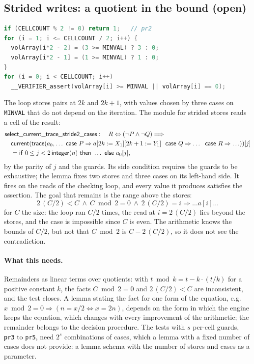 \subsection{Strided writes: a quotient in the bound (open)}\label{sec:pr2}
\begin{lstlisting}[language=C]
if (CELLCOUNT % 2 != 0) return 1;   // pr2
for (i = 1; i <= CELLCOUNT / 2; i++) {
  volArray[i*2 - 2] = (3 >= MINVAL) ? 3 : 0;
  volArray[i*2 - 1] = (1 >= MINVAL) ? 1 : 0;
}
for (i = 0; i < CELLCOUNT; i++)
  __VERIFIER_assert(volArray[i] >= MINVAL || volArray[i] == 0);
\end{lstlisting}
The loop stores pairs at $2k$ and $2k + 1$, with values chosen by three cases on \texttt{MINVAL} that do not depend
on the iteration. The module for strided stores reads a cell of the result:
\begin{align*}
  &\lemma{select\_current\_trace\_stride2\_cases}:\quad R \Leftrightarrow (\neg P \wedge \neg Q) \Longrightarrow\\
  &\quad \cur(\mathsf{trace}(a_0, \ldots\ \upd{P}{a[2k := X_1][2k + 1 := Y_1]}\ \ \upd{Q}{\ldots}\ \ \upd{R}{\ldots}))[j]\\
  &\quad = \ite{0 \le j < 2\,\intf(n)}{\ldots}{a_0[j]},
\end{align*}
by the parity of $j$ and the guards. Its side condition requires the guards to be exhaustive; the lemma fixes two
stores and three cases on its left-hand side. It fires on the reads of the checking loop, and every value it
produces satisfies the assertion. The goal that remains is the range above the stores:
\[ 2\,(C / 2) < C \ \wedge\ C \bmod 2 = 0 \ \wedge\ 2\,(C / 2) = i \Longrightarrow \ldots a[i] \ldots \]
for $C$ the size: the loop ran $C / 2$ times, the read at $i = 2\,(C / 2)$ lies beyond the stores, and the case is
impossible since $C$ is even. The arithmetic knows the bounds of $C / 2$, but not that $C \bmod 2$ is
$C - 2\,(C / 2)$, so it does not see the contradiction.

\paragraph{What this needs.} Remainders as linear terms over quotients: with $t \bmod k = t - k \cdot (t / k)$ for a
positive constant $k$, the facts $C \bmod 2 = 0$ and $2\,(C/2) < C$ are inconsistent, and the test closes. A lemma
stating the fact for one form of the equation, e.g.\ $x \bmod 2 = 0 \Rightarrow (n = x / 2 \Leftrightarrow x = 2n)$,
depends on the form in which the engine keeps the equation, which changes with every improvement of the arithmetic;
the remainder belongs to the decision procedure. The tests with $s$ per-cell guards, \texttt{pr3} to \texttt{pr5},
need $2^s$ combinations of cases, which a lemma with a fixed number of cases does not provide: a lemma schema with
the number of stores and cases as a parameter.

